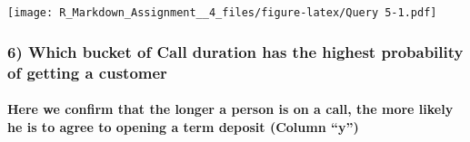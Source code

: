 \documentclass[]{article}
\let\oldparagraph\paragraph
\renewcommand{\paragraph}[1]{\oldparagraph{#1}\mbox{}}
\begin{document}
\texttt{[image: R\_Markdown\_Assignment\_\_4\_files/figure-latex/Query 5-1.pdf]}

\subsubsection{6) Which bucket of Call duration has the highest
probability of getting a
customer}\label{which-bucket-of-call-duration-has-the-highest-probability-of-getting-a-customer}

\paragraph{\texorpdfstring{Here we confirm that the longer a person is
on a call, the more likely he is to agree to opening a term deposit
(Column
``y'')}{Here we confirm that the longer a person is on a call, the more likely he is to agree to opening a term deposit (Column y)}}\label{here-we-confirm-that-the-longer-a-person-is-on-a-call-the-more-likely-he-is-to-agree-to-opening-a-term-deposit-column-y}
\end{document}
